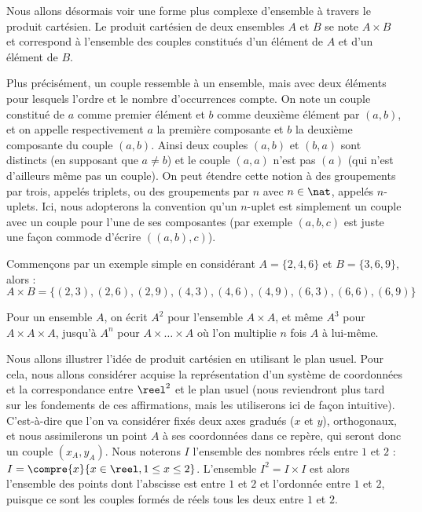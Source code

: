 Nous allons désormais voir une forme plus complexe d'ensemble à travers le produit cartésien. Le produit cartésien de deux ensembles $A$ et $B$ se note $A\times B$ et correspond à l'ensemble des couples constitués d'un élément de $A$ et d'un élément de $B$.

Plus précisément, un couple ressemble à un ensemble, mais avec deux éléments pour lesquels l'ordre et le nombre d'occurrences compte. On note un couple constitué de $a$ comme premier élément et $b$ comme deuxième élément par $(a,b)$, et on appelle respectivement $a$ la première composante et $b$ la deuxième composante du couple $(a,b)$. Ainsi deux couples $(a,b)$ et $(b,a)$ sont distincts (en supposant que $a\neq b$) et le couple $(a,a)$ n'est pas $(a)$ (qui n'est d'ailleurs même pas un couple). On peut étendre cette notion à des groupements par trois, appelés triplets, ou des groupements par $n$ avec $n\in \nat$, appelés $n$-uplets. Ici, nous adopterons la convention qu'un $n$-uplet est simplement un couple avec un couple pour l'une de ses composantes (par exemple $(a,b,c)$ est juste une façon commode d'écrire $((a,b),c)$).

\begin{expl}
    Commençons par un exemple simple en considérant $A=\{2,4,6\}$ et $B=\{3,6,9\}$, alors : $$A\times B = \{(2,3),(2,6),(2,9),(4,3),(4,6),(4,9),(6,3),(6,6),(6,9)\}$$
\end{expl}

\begin{rmk}
    Pour un ensemble $A$, on écrit $A^2$ pour l'ensemble $A\times A$, et même $A^3$ pour $A\times A \times A$, jusqu'à $A^n$ pour $A\times \ldots \times A$ où l'on multiplie $n$ fois $A$ à lui-même.
\end{rmk}

Nous allons illustrer l'idée de produit cartésien en utilisant le plan usuel. Pour cela, nous allons considérer acquise la représentation d'un système de coordonnées et la correspondance entre $\reel^2$ et le plan usuel (nous reviendront plus tard sur les fondements de ces affirmations, mais les utiliserons ici de façon intuitive). C'est-à-dire que l'on va considérer fixés deux axes gradués ($x$ et $y$), orthogonaux, et nous assimilerons un point $A$ à ses coordonnées dans ce repère, qui seront donc un couple $(x_A,y_A)$. Nous noterons $I$ l'ensemble des nombres réels entre $1$ et $2$ : $I=\compre{x}{x\in\reel, 1\leq x \leq 2}$. L'ensemble $I^2=I\times I$ est alors l'ensemble des points dont l'abscisse est entre $1$ et $2$ et l'ordonnée entre $1$ et $2$, puisque ce sont les couples formés de réels tous les deux entre $1$ et $2$.


